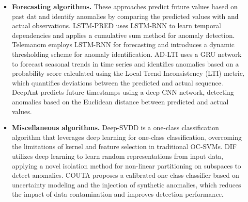 \begin{itemize}
    Generative models like GAN have shown great promise in generating realistic images and time series, and have been applied to time series AD as well.
    MADGAN \cite{li2019mad} employs an LSTM-RNN as the core model in a GAN framework for time series AD. It introduces a novel anomaly score based on reconstruction error and discrimination loss to identify anomalies.
    BeatGAN \cite{zhou2019beatgan} applies GANs to perform robust time series reconstruction for AD using adversarial regularization.
    

    \item \textbf{Forecasting algorithms.}
    These approaches predict future values based on past dat and identify anomalies by comparing the predicted  values with and actual observations. LSTM-PRED \cite{goh2017anomaly} uses LSTM-RNN to learn temporal dependencies and applies a cumulative sum method for anomaly detection. Telemanom \cite{hundman2018detecting} employs LSTM-RNN for forecasting and introduces a dynamic thresholding scheme for anomaly identification. AD-LTI \cite{wu2020developing} uses a GRU network to forecast seasonal trends in time series and identifies anomalies based on a probability score calculated using the Local Trend Inconsistency (LTI) metric, which quantifies deviations between the predicted and actual sequence. DeepAnt \cite{munir2018deepant} predicts future timestamps using a deep CNN network, detecting anomalies based on the Euclidean distance between predicted and actual values. 
    
    \item \textbf{Miscellaneous algorithms.}
    \ac{Deep-SVDD} \cite{pmlr-v80-ruff18a} is a one-class classification algorithm that leverages deep learning for one-class classification, overcoming the limitations of kernel and feature selection in traditional OC-SVMs. \ac{DIF} \cite{xu2023deep} utilizes deep learning to learn random representations from input data, applying a novel isolation method for non-linear partitioning on subspaces to detect anomalies. \ac{COUTA} \cite{xu2024calibrated} proposes a calibrated one-class classifier based on uncertainty modeling and the injection of synthetic anomalies, which reduces the impact of data contamination and improves detection performance.

\end{itemize}

